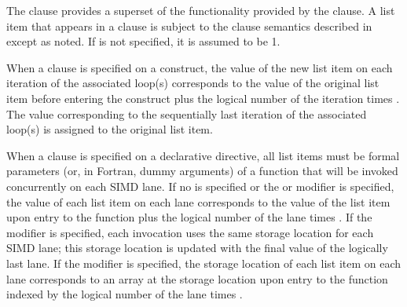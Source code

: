 \descr
The  clause provides a superset of the functionality provided by the  clause.
A list item that appears in a  clause is subject to the  clause semantics described
in  except as noted.
If  is not specified, it is assumed to be 1.

When a  clause is specified on a construct, the value of the new list item on each iteration of the associated loop(s) corresponds to the value of the original list item before entering the construct plus the logical number of the iteration times .
The value corresponding to the sequentially last iteration of the associated loop(s) is assigned to the original list item.

When a  clause is specified on a declarative directive, all list items must be formal parameters (or, in Fortran, dummy arguments) of a function that will be invoked concurrently on each SIMD lane.
If no  is specified or the  or  modifier is specified, the value of each list item on each lane corresponds to the value of the list item upon entry to the function plus the logical number of the lane times .
If the  modifier is specified, each invocation uses the same storage location for each SIMD lane; this storage location is updated with the final value of the logically last lane.
If the  modifier is specified, the storage location of each list item on each lane corresponds to an array at the storage location upon entry to the function indexed by the logical number of the lane times .


